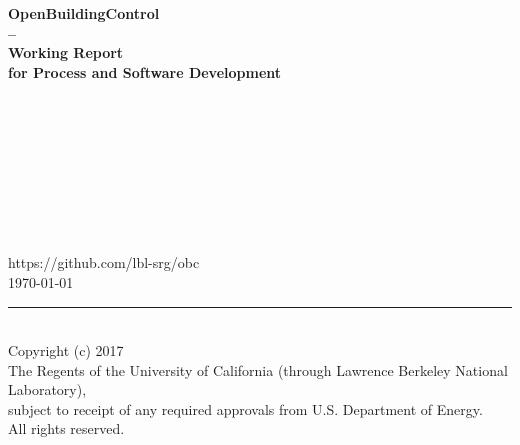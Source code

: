 \begin{titlepage}
\begin{minipage}{\headwidth}
\begin{flushright}
\vspace{-1cm}
\large{~}
\\[5mm]
\hrulefill
\\[5mm]
 \Large\sffamily\bfseries{OpenBuildingControl}\\
 \Large\sffamily\bfseries{--}\\[3mm]
 \Large\sffamily\bfseries{Working Report}\\
 \Large\sffamily\bfseries{for Process and Software Development}
\\
\hrulefill
~\\[30mm]
\end{flushright}
\begin{center}
\large{~}\\
\large{~}\\
\large{~}\\
\large{~}\\
\large{~}\\
\large{~}\\
\large{~}\\
\large{https://github.com/lbl-srg/obc}
~\\[30mm]
\large{\today}
\\[50mm]
\end{center}
\hrule
~\\[2mm]
Copyright (c) 2017\\
The Regents of the University of California
(through Lawrence Berkeley National Laboratory),\\
subject to receipt of any required approvals from U.S. Department of Energy.\\
All rights reserved.
\end{minipage}
\end{titlepage}
